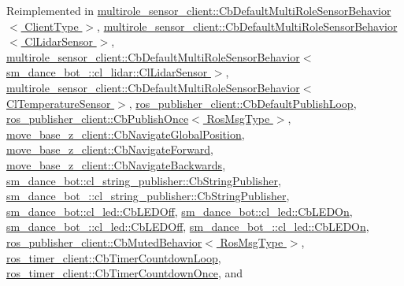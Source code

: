 Reimplemented in \hyperlink{classmultirole__sensor__client_1_1CbDefaultMultiRoleSensorBehavior_a57c5eff1507f6c85921e290a9d280ad7}{multirole\+\_\+sensor\+\_\+client\+::\+Cb\+Default\+Multi\+Role\+Sensor\+Behavior$<$ Client\+Type $>$}, \hyperlink{classmultirole__sensor__client_1_1CbDefaultMultiRoleSensorBehavior_a57c5eff1507f6c85921e290a9d280ad7}{multirole\+\_\+sensor\+\_\+client\+::\+Cb\+Default\+Multi\+Role\+Sensor\+Behavior$<$ Cl\+Lidar\+Sensor $>$}, \hyperlink{classmultirole__sensor__client_1_1CbDefaultMultiRoleSensorBehavior_a57c5eff1507f6c85921e290a9d280ad7}{multirole\+\_\+sensor\+\_\+client\+::\+Cb\+Default\+Multi\+Role\+Sensor\+Behavior$<$ sm\+\_\+dance\+\_\+bot\+\_\+::cl\+\_\+lidar\+::\+Cl\+Lidar\+Sensor $>$}, \hyperlink{classmultirole__sensor__client_1_1CbDefaultMultiRoleSensorBehavior_a57c5eff1507f6c85921e290a9d280ad7}{multirole\+\_\+sensor\+\_\+client\+::\+Cb\+Default\+Multi\+Role\+Sensor\+Behavior$<$ Cl\+Temperature\+Sensor $>$}, \hyperlink{classros__publisher__client_1_1CbDefaultPublishLoop_a47605e0cb9236077c9d9b0c42db9708c}{ros\+\_\+publisher\+\_\+client\+::\+Cb\+Default\+Publish\+Loop}, \hyperlink{classros__publisher__client_1_1CbPublishOnce_a879c967bb3e5e894e61256629636fcbd}{ros\+\_\+publisher\+\_\+client\+::\+Cb\+Publish\+Once$<$ Ros\+Msg\+Type $>$}, \hyperlink{classmove__base__z__client_1_1CbNavigateGlobalPosition_ac7994a9da6384c1b9ad3826bfebb5f56}{move\+\_\+base\+\_\+z\+\_\+client\+::\+Cb\+Navigate\+Global\+Position}, \hyperlink{classmove__base__z__client_1_1CbNavigateForward_aad7d35b5c46b938cfa64a6f14ecf2337}{move\+\_\+base\+\_\+z\+\_\+client\+::\+Cb\+Navigate\+Forward}, \hyperlink{classmove__base__z__client_1_1CbNavigateBackwards_a6046911372eedceeb2d29794a50a3443}{move\+\_\+base\+\_\+z\+\_\+client\+::\+Cb\+Navigate\+Backwards}, \hyperlink{classsm__dance__bot_1_1cl__string__publisher_1_1CbStringPublisher_ac93cc1eb150140331cb3e560ec8249e2}{sm\+\_\+dance\+\_\+bot\+::cl\+\_\+string\+\_\+publisher\+::\+Cb\+String\+Publisher}, \hyperlink{classsm__dance__bot__3_1_1cl__string__publisher_1_1CbStringPublisher_a7a110784e275e8726246d7ec08b2df45}{sm\+\_\+dance\+\_\+bot\+\_\+::cl\+\_\+string\+\_\+publisher\+::\+Cb\+String\+Publisher}, \hyperlink{classsm__dance__bot_1_1cl__led_1_1CbLEDOff_ad0db28985308dd486943d1f511c655ad}{sm\+\_\+dance\+\_\+bot\+::cl\+\_\+led\+::\+Cb\+L\+E\+D\+Off}, \hyperlink{classsm__dance__bot_1_1cl__led_1_1CbLEDOn_a60a82058c585b4d0398b531c1e1bdf0b}{sm\+\_\+dance\+\_\+bot\+::cl\+\_\+led\+::\+Cb\+L\+E\+D\+On}, \hyperlink{classsm__dance__bot__3_1_1cl__led_1_1CbLEDOff_a0199329ec77ae6ab0cc68e56db4e0db6}{sm\+\_\+dance\+\_\+bot\+\_\+::cl\+\_\+led\+::\+Cb\+L\+E\+D\+Off}, \hyperlink{classsm__dance__bot__3_1_1cl__led_1_1CbLEDOn_a321eb11b26db056d477264cc582afbcf}{sm\+\_\+dance\+\_\+bot\+\_\+::cl\+\_\+led\+::\+Cb\+L\+E\+D\+On}, \hyperlink{classros__publisher__client_1_1CbMutedBehavior_aad2c833afdc6f5d81f3ddce3c0f767e3}{ros\+\_\+publisher\+\_\+client\+::\+Cb\+Muted\+Behavior$<$ Ros\+Msg\+Type $>$}, \hyperlink{classros__timer__client_1_1CbTimerCountdownLoop_aa671fabe23945e85e65cee7a3c1e761b}{ros\+\_\+timer\+\_\+client\+::\+Cb\+Timer\+Countdown\+Loop}, \hyperlink{classros__timer__client_1_1CbTimerCountdownOnce_af2d3d5b803e19cd843db010d0406503a}{ros\+\_\+timer\+\_\+client\+::\+Cb\+Timer\+Countdown\+Once}, and 